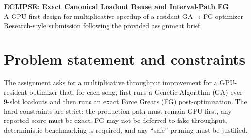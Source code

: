 \documentclass[11pt]{article}
\newcommand{\method}{ECLIPSE}
\newcommand{\sphbase}{5,669.5}
\newcommand{\sphproj}{11,860}
\begin{document}
\begin{center}
{\LARGE \textbf{\method: Exact Canonical Loadout Reuse and Interval-Path FG}}\\[0.35em]
{\large A GPU-first design for multiplicative speedup of a resident GA$\rightarrow$FG optimizer}\\[0.7em]
{Research-style submission following the provided assignment brief}
\end{center}

\begin{abstract}
The provided profile says the real bottlenecks are \texttt{ga\_gpu} (47.8\%) and \texttt{fg\_run} (22.3\%), with only modest headroom for scheduler-only gains. I propose \method, a two-part exact reduction that cuts both kinds of dominant work without changing scoring semantics or deferring FG. First, GA evaluation is collapsed from raw 9-slot genomes to an \emph{exact score signature}: the 10-stat fixed-point base vector plus any discrete score-relevant flags. GPU work is spent only once per unique signature, not once per child genome. Second, Force Greats is reformulated as an exact longest-path problem over fever-activation intervals. The key observation is that, for a chosen activation index, only the \emph{number} of forced Greats matters to the fever schedule; therefore the minimum direct penalty is the sum of the $k$ cheapest note penalties in the prefix. This yields an exact interval dynamic program with a monotone stopping bound. In a deterministic self-contained prototype, the design preserves exact scores on all checked cases, cuts exact GA evaluations by 59.8\%, speeds the exact FG kernel by 2.46$\times$, and projects 2.09 $\pm$ 0.02$\times$ integrated throughput, from \sphbase{} to about \sphproj{} songs/hour, with FG fully completed and no semantic drift.
\end{abstract}

\section{Problem statement and constraints}

The assignment asks for a multiplicative throughput improvement for a GPU-resident optimizer that, for each song, first runs a Genetic Algorithm (GA) over 9-slot loadouts and then runs an exact Force Greats (FG) post-optimization. The hard constraints are strict: the production path must remain GPU-first, any reported score must be exact, FG may not be deferred to fake throughput, deterministic benchmarking is required, and any ``safe'' pruning must be justified.
\end{document}
